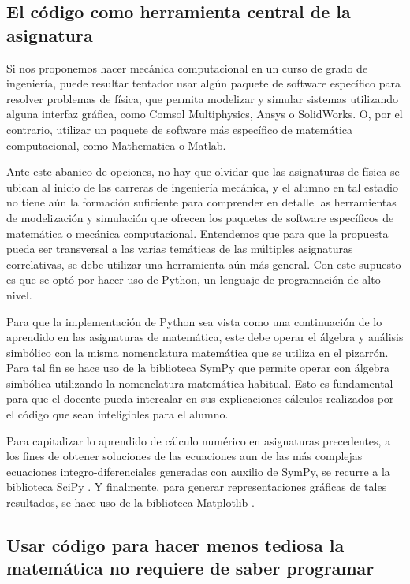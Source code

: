\documentclass[a4paper]{fodami}        %
\begin{document}
\subsection{El código como herramienta central de la asignatura}

Si nos proponemos hacer mecánica computacional en un curso de grado de ingeniería, puede resultar tentador usar algún paquete de software específico para resolver problemas de física, que permita modelizar y simular sistemas utilizando alguna interfaz gráfica, como Comsol Multiphysics, Ansys o SolidWorks.
O, por el contrario, utilizar un paquete de software más específico de matemática computacional, como Mathematica o Matlab.

Ante este abanico de opciones, no hay que olvidar que las asignaturas de física se ubican al inicio de las carreras de ingeniería mecánica, y el alumno en tal estadio no tiene aún la formación suficiente para comprender en detalle las herramientas de modelización y simulación que ofrecen los paquetes de software específicos de matemática o mecánica computacional.
Entendemos que para que la propuesta pueda ser transversal a las varias temáticas de las múltiples asignaturas correlativas, se debe utilizar una herramienta aún más general. 
Con este supuesto es que se optó por hacer uso de Python, un lenguaje de programación de alto nivel.

Para que la implementación de Python sea vista como una continuación de lo aprendido en las asignaturas de matemática, este debe operar el álgebra y análisis simbólico con la misma nomenclatura matemática que se utiliza en el pizarrón.
Para tal fin se hace uso de la biblioteca SymPy \cite{sympy} que permite operar con álgebra simbólica utilizando la nomenclatura matemática habitual.
Esto es fundamental para que el docente pueda intercalar en sus explicaciones cálculos realizados por el código que sean inteligibles para el alumno.

Para capitalizar lo aprendido de cálculo numérico en asignaturas precedentes, a los fines de obtener soluciones de las ecuaciones aun de las más complejas ecuaciones integro-diferenciales generadas con auxilio de SymPy, se recurre a la biblioteca SciPy \cite{2020SciPy-NMeth}.
Y finalmente, para generar representaciones gráficas de tales resultados, se hace uso de la biblioteca Matplotlib \cite{Hunter:2007}.


\subsection{Usar código para hacer menos tediosa la matemática no requiere de saber programar}
\end{document}
